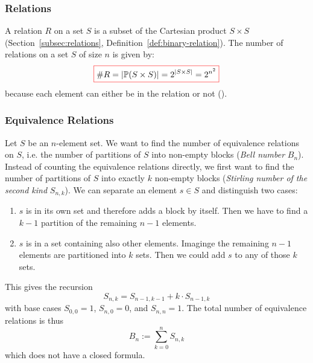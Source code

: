 \subsubsection{Relations}
\label{subsubsec:relations}
A relation \(R\) on a set \(S\) is a subset of the Cartesian product \(S\times S\) (Section~\ref{subsec:relations}, Definition~\ref{def:binary-relation}).
The number of relations on a set \(S\) of size \(n\) is given by:
\begin{equation}\label{eq:number-of-relations}
\fcolorbox{red}{white}{$\displaystyle
\# R = \left| \mathbb{P}(S\times S) \right| = 2^{\left| S\times S \right|} = 2^{n^2}
$}
\end{equation}
because each element can either be in the relation or not ().

\subsubsection{Equivalence Relations}
\label{subsubsec:equiv-relations}
Let \(S\) be an \(n\)-element set. 
We want to find the number of equivalence relations on \(S\), i.e. the number of partitions of \(S\) into non-empty blocks (\emph{Bell number} \(B_n\)).
Instead of counting the equivalence relations directly, we first want to find the number of partitions of \(S\) into exactly \(k\) non-empty blocks (\emph{Stirling number of the second kind} \(S_{n,k}\)).
We can separate an element \(s\in S\) and distinguish two cases:
\begin{enumerate}
\item \(s\) is in its own set and therefore adds a block by itself.
Then we have to find a \(k-1\) partition of the remaining \(n-1\) elements. 
\label{case:equiv-relations:own-set}
\item \(s\) is in a set containing also other elements.
Imaginge the remaining \(n-1\) elements are partitioned into \(k\) sets.
Then we could add \(s\) to any of those \(k\) sets.
\label{case:equiv-relations:with-other-elements}
\end{enumerate}
This gives the recursion
\begin{equation}\label{eq:stirling-second}
  S_{n,k}
  =
  S_{n-1,k-1}
  +
  k \cdot S_{n-1,k}%
\end{equation}
with base cases \(S_{0,0}=1\), \(S_{n,0}=0\), and \(S_{n,n}=1\). %
The total number of equivalence relations is thus 
\begin{equation}\label{eq:bell}
  B_{n} := \sum_{k=0}^{n} S_{n,k}
\end{equation}
which does not have a closed formula.

